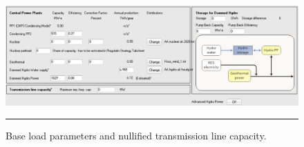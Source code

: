 \begin{figure}[htbp]
	\centering
	\includegraphics[width=\textwidth]{figures/B02_base_load.png}
	\rule{\textwidth}{0.5pt} %
	\caption{Base load parameters and nullified transmission line capacity.}
	\label{fig:B02-base_load}
\end{figure}